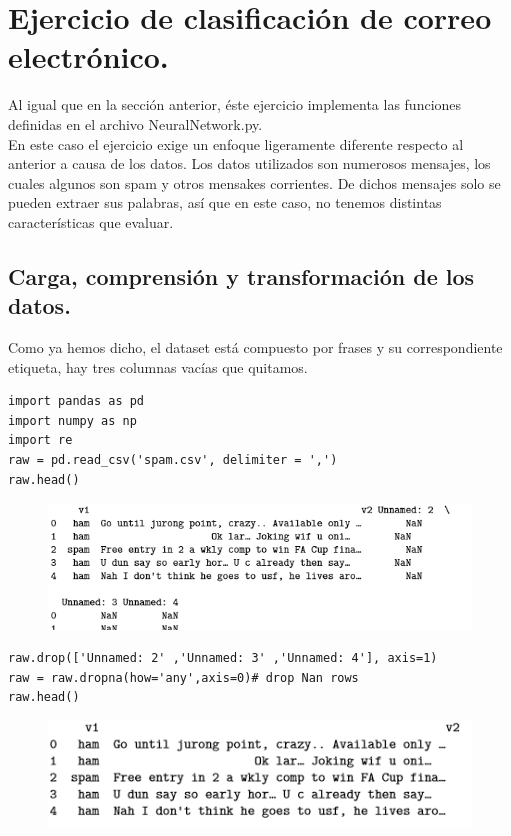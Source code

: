 \documentclass[a4paper,10pt]{article}
\begin{document}
\section{Ejercicio de clasificación de correo electrónico.}
Al igual que en la sección anterior, éste ejercicio implementa las funciones definidas en el archivo NeuralNetwork.py.\\ En este caso el ejercicio exige un enfoque ligeramente diferente respecto al anterior a causa de los datos. Los datos utilizados son numerosos mensajes, los cuales algunos son spam y otros mensakes corrientes. De dichos mensajes solo se pueden extraer sus palabras, así que en este caso, no tenemos distintas características que evaluar.
\subsection{Carga, comprensión y transformación de los datos.}
Como ya hemos dicho, el dataset está compuesto por frases y su correspondiente etiqueta, hay tres columnas vacías que quitamos.
\begin{lstlisting}
import pandas as pd
import numpy as np
import re
raw = pd.read_csv('spam.csv', delimiter = ',')
raw.head()
\end{lstlisting}
\begin{figure}[H]
\centering
\includegraphics[scale=0.9]{Annotation 2020-03-23 174228.png}
\end{figure}
\begin{lstlisting}
raw.drop(['Unnamed: 2' ,'Unnamed: 3' ,'Unnamed: 4'], axis=1)
raw = raw.dropna(how='any',axis=0)# drop Nan rows
raw.head()
\end{lstlisting}
\begin{figure}[H]
\centering
\includegraphics{Annotation 2020-03-23 174341.png}
\end{figure}
\end{document}
